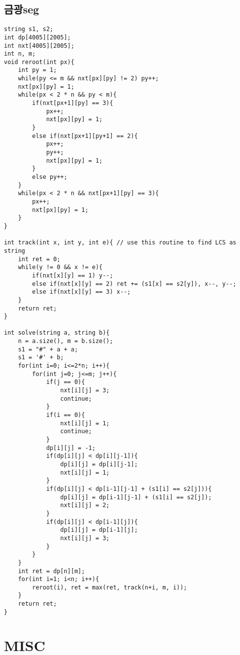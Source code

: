 \documentclass[landscape, 8pt, a4paper, oneside, twocolumn]{extarticle}
\begin{document}
\subsection{금광seg}
\begin{verbatim}
string s1, s2;
int dp[4005][2005];
int nxt[4005][2005];
int n, m;
void reroot(int px){
	int py = 1;
	while(py <= m && nxt[px][py] != 2) py++;
	nxt[px][py] = 1;
	while(px < 2 * n && py < m){
		if(nxt[px+1][py] == 3){
			px++;
			nxt[px][py] = 1;
		}
		else if(nxt[px+1][py+1] == 2){
			px++;
			py++;
			nxt[px][py] = 1;
		}
		else py++;
	}
	while(px < 2 * n && nxt[px+1][py] == 3){
		px++;
		nxt[px][py] = 1;
	}
}

int track(int x, int y, int e){ // use this routine to find LCS as string
	int ret = 0;
	while(y != 0 && x != e){
		if(nxt[x][y] == 1) y--;
		else if(nxt[x][y] == 2) ret += (s1[x] == s2[y]), x--, y--;
		else if(nxt[x][y] == 3) x--;
	}
	return ret;
}

int solve(string a, string b){
	n = a.size(), m = b.size();
	s1 = "#" + a + a;
	s1 = '#' + b;
	for(int i=0; i<=2*n; i++){
		for(int j=0; j<=m; j++){
			if(j == 0){
				nxt[i][j] = 3;
				continue;
			}
			if(i == 0){
				nxt[i][j] = 1;
				continue;
			}
			dp[i][j] = -1;
			if(dp[i][j] < dp[i][j-1]){
				dp[i][j] = dp[i][j-1];
				nxt[i][j] = 1;
			}
			if(dp[i][j] < dp[i-1][j-1] + (s1[i] == s2[j])){
				dp[i][j] = dp[i-1][j-1] + (s1[i] == s2[j]);
				nxt[i][j] = 2;
			}
			if(dp[i][j] < dp[i-1][j]){
				dp[i][j] = dp[i-1][j];
				nxt[i][j] = 3;
			}
		}
	}
	int ret = dp[n][m];
	for(int i=1; i<n; i++){
		reroot(i), ret = max(ret, track(n+i, m, i));
	}
	return ret;
}
\end{verbatim}
\section{MISC}
\end{document}
